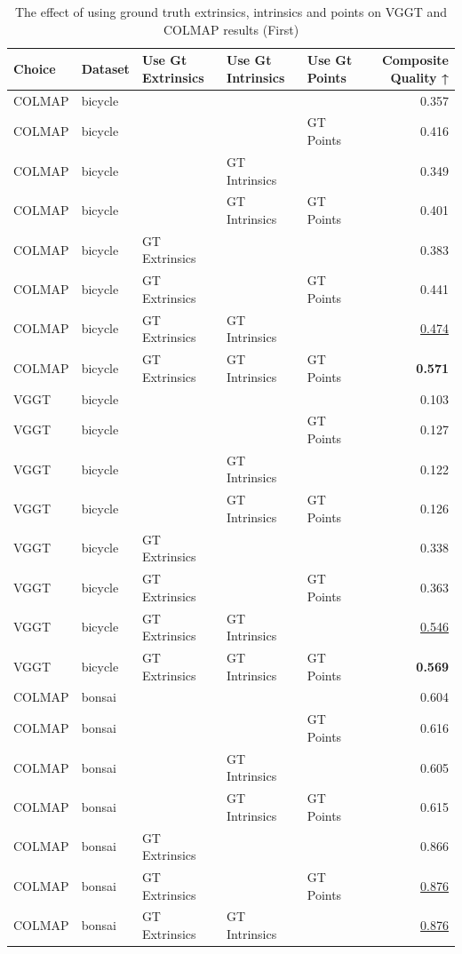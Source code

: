 \begin{table}[H]
\caption{The effect of using ground truth extrinsics, intrinsics and points on VGGT and COLMAP results (First)}
\label{tab:06_gt_cams_first}
\small
\begin{tabular}{lllllr}
\toprule
Choice & Dataset & Use Gt Extrinsics & Use Gt Intrinsics & Use Gt Points & Composite Quality ↑ \\
\midrule
COLMAP & bicycle &  &  &  & 0.357 \\
COLMAP & bicycle &  &  & GT Points & 0.416 \\
COLMAP & bicycle &  & GT Intrinsics &  & 0.349 \\
COLMAP & bicycle &  & GT Intrinsics & GT Points & 0.401 \\
COLMAP & bicycle & GT Extrinsics &  &  & 0.383 \\
COLMAP & bicycle & GT Extrinsics &  & GT Points & 0.441 \\
COLMAP & bicycle & GT Extrinsics & GT Intrinsics &  & \underline{0.474} \\
COLMAP & bicycle & GT Extrinsics & GT Intrinsics & GT Points & \textbf{0.571} \\
\midrule
VGGT & bicycle &  &  &  & 0.103 \\
VGGT & bicycle &  &  & GT Points & 0.127 \\
VGGT & bicycle &  & GT Intrinsics &  & 0.122 \\
VGGT & bicycle &  & GT Intrinsics & GT Points & 0.126 \\
VGGT & bicycle & GT Extrinsics &  &  & 0.338 \\
VGGT & bicycle & GT Extrinsics &  & GT Points & 0.363 \\
VGGT & bicycle & GT Extrinsics & GT Intrinsics &  & \underline{0.546} \\
VGGT & bicycle & GT Extrinsics & GT Intrinsics & GT Points & \textbf{0.569} \\
\midrule
COLMAP & bonsai &  &  &  & 0.604 \\
COLMAP & bonsai &  &  & GT Points & 0.616 \\
COLMAP & bonsai &  & GT Intrinsics &  & 0.605 \\
COLMAP & bonsai &  & GT Intrinsics & GT Points & 0.615 \\
COLMAP & bonsai & GT Extrinsics &  &  & 0.866 \\
COLMAP & bonsai & GT Extrinsics &  & GT Points & \underline{0.876} \\
COLMAP & bonsai & GT Extrinsics & GT Intrinsics &  & \underline{0.876} \\

\end{tabular}
\end{table}
